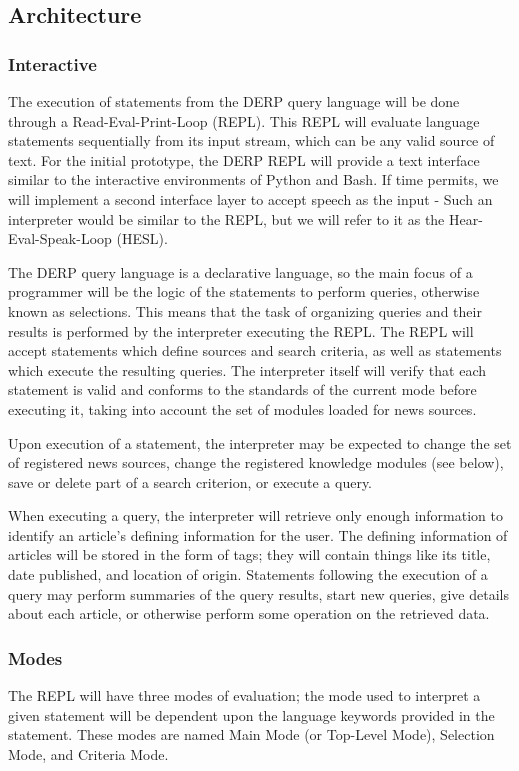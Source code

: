 \subsection{Architecture}

\subsubsection{Interactive}
The execution of statements from the DERP query language will be done through a Read-Eval-Print-Loop (REPL). This REPL will evaluate language statements sequentially from its input stream, which can be any valid source of text. For the initial prototype, the DERP REPL will provide a text interface similar to the interactive environments of Python and Bash. If time permits, we will implement a second interface layer to accept speech as the input - Such an interpreter would be similar to the REPL, but we will refer to it as the Hear-Eval-Speak-Loop (HESL).

The DERP query language is a declarative language, so the main focus of a programmer will be the logic of the statements to perform queries, otherwise known as selections. This means that the task of organizing queries and their results is performed by the interpreter executing the REPL. The REPL will accept statements which define sources and search criteria, as well as statements which execute the resulting queries. The interpreter itself will verify that each statement is valid and conforms to the standards of the current mode before executing it, taking into account the set of modules loaded for news sources.

Upon execution of a statement, the interpreter may be expected to change the set of registered news sources, change the registered knowledge modules (see below), save or delete part of a search criterion, or execute a query.

When executing a query, the interpreter will retrieve only enough information to identify an article's defining information for the user. The defining information of articles will be stored in the form of tags; they will contain things like its title, date published, and location of origin. Statements following the execution of a query may perform summaries of the query results, start new queries, give details about each article, or otherwise perform some operation on the retrieved data.

\subsubsection{Modes}
The REPL will have three modes of evaluation; the mode used to interpret a given statement will be dependent upon the language keywords provided in the statement. These modes are named Main Mode (or Top-Level Mode), Selection Mode, and Criteria Mode.

